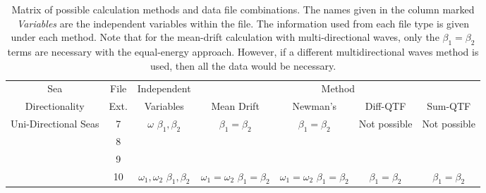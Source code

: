 \begin{table}
   \centering
   \caption[Matrix of possible calculation methods and data file combinations.]
         {Matrix of possible calculation methods and data file combinations.
         The names given in the column marked \emph{Variables} are the independent variables within the file.
         The information used from each file type is given under each method.  Note that for the mean-drift calculation with multi-directional waves,
         only the $\beta_1 = \beta_2$ terms are necessary with the equal-energy approach.  However, if a different multidirectional waves method is used,
         then all the data would be necessary.
      \label{tab:Wamit2MethodsByFileType}}
   \small{
   \begin{tabular}{ccccccc}
      \toprule
         Sea               &  File  &  Independent   &  \multicolumn{4}{c}{Method}                      \\ \cmidrule(lr){4-7}
         Directionality    &  Ext.  &  Variables   & Mean Drift   &  Newman's &  Diff-QTF &  Sum-QTF  \\
      \midrule
         \multirow{6}{*}{\parbox[c]{18mm}{\centering Uni-Directional Seas}}
            &  7  &  \multirow{3}{*}{\parbox[c]{15mm}{\centering $\omega$\\$\beta_1,\beta_2$}}
                  &  \multirow{3}{*}{\parbox[c]{15mm}{\centering $\beta_1 = \beta_2$}}
                     &  \multirow{3}{*}{\parbox[c]{15mm}{\centering $\beta_1 = \beta_2$}}
                        &  \multirow{3}{*}{\parbox[c]{15mm}{\centering Not possible}}
                           &  \multirow{3}{*}{\parbox[c]{15mm}{\centering Not possible}}
                                 \\
            &  8  &  &  &  &  &  \\
            &  9  &  &  &  &  &  \\  \cmidrule(lr){2-7}
            & 10  &  \multirow{3}{*}{\parbox[c]{15mm}{\centering $\omega_1,\omega_2$\\$\beta_1,\beta_2$}}
                  &  \multirow{3}{*}{\parbox[c]{15mm}{\centering $\omega_1=\omega_2$\\$\beta_1=\beta_2$}}
                     &  \multirow{3}{*}{\parbox[c]{15mm}{\centering $\omega_1=\omega_2$\\$\beta_1=\beta_2$}}
                        &  \multirow{3}{*}{\parbox[c]{15mm}{\centering $\beta_1=\beta_2$}}
                           &  \multirow{3}{*}{\parbox[c]{15mm}{\centering $\beta_1=\beta_2$}}
                                 \\

\end{tabular}}
\end{table}
